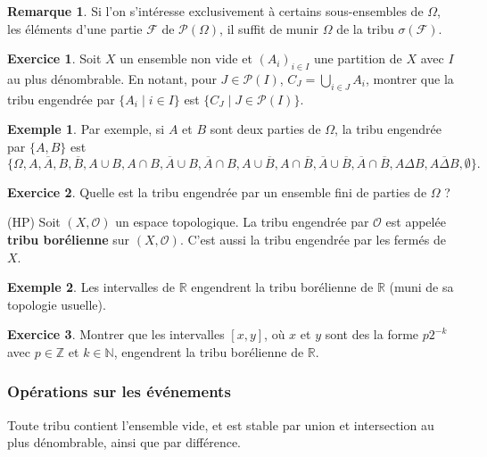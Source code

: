 \documentclass[french]{article}
\newcommand{\N}{\mathbb{N}}
\newcommand{\Z}{\mathbb{Z}}
\newcommand{\R}{\mathbb{R}}
\theoremstyle{plain}
\theoremstyle{definition}
\newtheorem*{ex}{Exemple}
\newtheorem{exo}{Exercice}
\newtheorem*{rmq}{Remarque}
\theoremstyle{remark}
\begin{document}
\begin{rmq}
	Si l'on s'intéresse exclusivement à certains sous-ensembles de $\Omega$, les éléments d'une partie $\mathcal{F}$ de $\mathcal{P}(\Omega)$, il suffit de munir $\Omega$ de la tribu $\sigma(\mathcal{F})$. 
\end{rmq}

\begin{exo}
	Soit $X$ un ensemble non vide et $(A_i)_{i\in I}$ une partition de $X$ avec $I$ au plus dénombrable. En notant, pour $J\in\mathcal{P}(I)$, $C_J=\displaystyle\bigcup_{i\in J}A_i$, montrer que la tribu engendrée par $\{A_i\mid i\in I\}$ est $\{C_J\mid J\in\mathcal{P}(I)\}$.
\end{exo}

\begin{ex}
	Par exemple, si $A$ et $B$ sont deux parties de $\Omega$, la tribu engendrée par $\{A,B\}$ est $$\{\Omega,A,\overline{A},B,\overline{B},A\cup B, A\cap B, \overline{A}\cup B, \overline{A}\cap B, A\cup\overline{B}, A\cap\overline{B}, \overline{A}\cup\overline{B}, \overline{A}\cap\overline{B},A\Delta B, \overline{A\Delta B},\emptyset\}.$$
\end{ex}

\begin{exo}
	Quelle est la tribu engendrée par un ensemble fini de parties de $\Omega$ ?
\end{exo}

\begin{dfn}{(HP)}
	Soit $(X,\mathcal{O})$ un espace topologique. La tribu engendrée par $\mathcal{O}$ est appelée \textbf{tribu borélienne} sur $(X,\mathcal{O})$. C'est aussi la tribu engendrée par les fermés de $X$.
\end{dfn}

\begin{ex}
	Les intervalles de $\R$ engendrent la tribu borélienne de $\R$ (muni de sa topologie usuelle).
\end{ex}

\begin{exo}
	Montrer que les intervalles $[x,y]$, où $x$ et $y$ sont des la forme $p2^{-k}$ avec $p\in\Z$ et $k\in\N$, engendrent la tribu borélienne de $\R$.
\end{exo}

\subsubsection*{Opérations sur les événements}

\begin{thm}{}%
	Toute tribu contient l'ensemble vide, et est stable par union et intersection au plus dénombrable, ainsi que par différence.
\end{thm}
\end{document}

